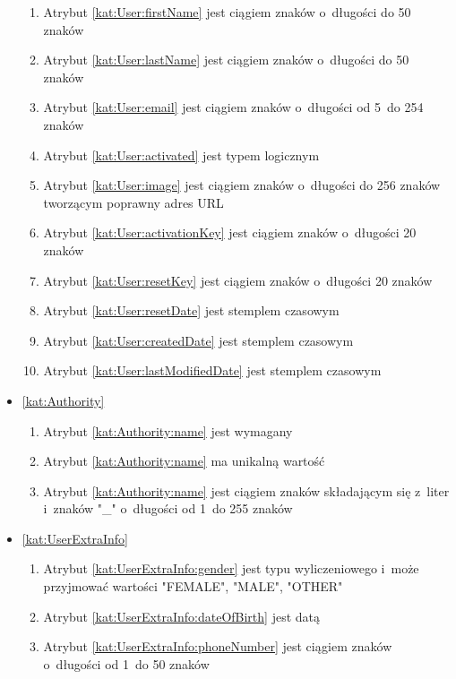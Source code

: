 \begin{itemize}[label={\textbf{Ograniczenia dla}}, wide, labelwidth=!, labelindent=0pt]
\begin{enumerate}[label={\textbf{OGR/\protect\threedigits{\arabic{enumi}}}}, wide, labelwidth=!, align=left, leftmargin=3cm, resume]
        \item Atrybut \ref{kat:User:firstName} jest ciągiem znaków o~długości do 50 znaków
        \item Atrybut \ref{kat:User:lastName} jest ciągiem znaków o~długości do 50 znaków
        \item Atrybut \ref{kat:User:email} jest ciągiem znaków o~długości od 5~do 254 znaków
        \item Atrybut \ref{kat:User:activated} jest typem logicznym
        \item Atrybut \ref{kat:User:image} jest ciągiem znaków o~długości do 256 znaków tworzącym poprawny adres URL
        \item Atrybut \ref{kat:User:activationKey} jest ciągiem znaków o~długości 20 znaków
        \item Atrybut \ref{kat:User:resetKey} jest ciągiem znaków o~długości 20 znaków
        \item Atrybut \ref{kat:User:resetDate} jest stemplem czasowym
        \item Atrybut \ref{kat:User:createdDate} jest stemplem czasowym
        \item Atrybut \ref{kat:User:lastModifiedDate} jest stemplem czasowym
    \end{enumerate}
    \item\ref{kat:Authority}
    \begin{enumerate}[label={\textbf{OGR/\protect\threedigits{\arabic{enumi}}}}, wide, labelwidth=!, align=left, leftmargin=3cm, resume]
        \item Atrybut \ref{kat:Authority:name} jest wymagany
        \item Atrybut \ref{kat:Authority:name} ma unikalną wartość
        \item Atrybut \ref{kat:Authority:name} jest ciągiem znaków składającym się z~liter i~znaków "\_" o~długości od 1~do 255 znaków
    \end{enumerate}
    \item\ref{kat:UserExtraInfo}
    \begin{enumerate}[label={\textbf{OGR/\protect\threedigits{\arabic{enumi}}}}, wide, labelwidth=!, align=left, leftmargin=3cm, resume]
        \item Atrybut \ref{kat:UserExtraInfo:gender} jest typu wyliczeniowego i~może przyjmować wartości "FEMALE", "MALE", "OTHER"
        \item Atrybut \ref{kat:UserExtraInfo:dateOfBirth} jest datą
        \item Atrybut \ref{kat:UserExtraInfo:phoneNumber} jest ciągiem znaków o~długości od 1~do 50 znaków

\end{enumerate}
\end{itemize}
